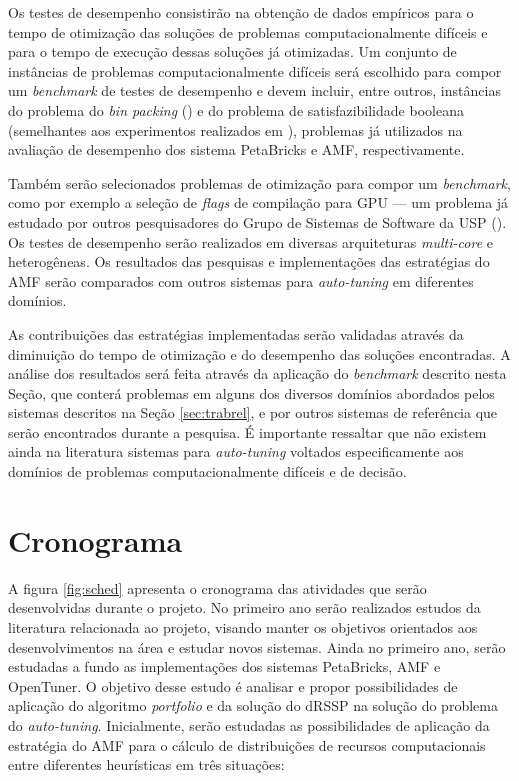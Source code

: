 \documentclass[a4paper, 12pt]{article}
\begin{document}
Os testes de desempenho consistirão na obtenção de dados empíricos para o tempo
de otimização das soluções de problemas computacionalmente difíceis e para o
tempo de execução dessas soluções já otimizadas. Um conjunto de instâncias de
problemas computacionalmente difíceis será escolhido para compor
um \emph{benchmark} de testes de desempenho e devem incluir, entre outros,
instâncias do problema do \emph{bin packing} (\citet{de1981bin}) e do problema
de satisfazibilidade booleana (semelhantes aos experimentos realizados em
\citet{goldman2011optimizing}), problemas já utilizados na avaliação de
desempenho dos sistema PetaBricks e AMF, respectivamente.

Também serão selecionados problemas de otimização para compor um
\emph{benchmark}, como por exemplo a seleção de \emph{flags} de compilação para
GPU --- um problema já estudado por outros pesquisadores do Grupo de Sistemas
de Software da USP (\citet{marcosFAPESP}). Os testes de desempenho serão
realizados em diversas arquiteturas \emph{multi-core} e heterogêneas. Os
resultados das pesquisas e implementações das estratégias do AMF serão
comparados com outros sistemas para \emph{auto-tuning} em diferentes domínios.

As contribuições das estratégias implementadas serão validadas através da
diminuição do tempo de otimização e do desempenho das soluções encontradas.
A análise dos resultados será feita através da aplicação do \emph{benchmark}
descrito nesta Seção, que conterá problemas em alguns dos diversos domínios
abordados pelos sistemas descritos na Seção \ref{sec:trabrel}, e por outros
sistemas de referência que serão encontrados durante a pesquisa. É importante
ressaltar que não existem ainda na literatura sistemas para \emph{auto-tuning}
voltados especificamente aos domínios de problemas computacionalmente difíceis
e de decisão.

\section{Cronograma} \label{sec:sched}

A figura \ref{fig:sched} apresenta o cronograma das atividades que serão
desenvolvidas durante o projeto.
No primeiro ano serão realizados estudos da literatura relacionada ao projeto,
visando manter os objetivos orientados aos desenvolvimentos na área e
estudar novos sistemas. Ainda no primeiro ano, serão estudadas a fundo as
implementações dos sistemas PetaBricks, AMF e OpenTuner. O objetivo desse
estudo é analisar e propor possibilidades de aplicação do algoritmo
\emph{portfolio} e da solução do dRSSP na solução do problema do
\emph{auto-tuning}. Inicialmente, serão estudadas as possibilidades de aplicação
da estratégia do AMF para o cálculo de distribuições de recursos computacionais
entre diferentes heurísticas em três situações:
\end{document}
